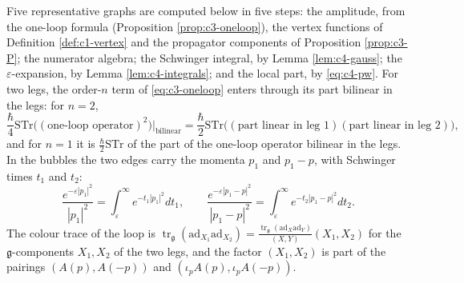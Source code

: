 Five representative graphs are computed below in five steps: the amplitude, from the one-loop formula (Proposition \ref{prop:c3-oneloop}), the vertex functions of Definition \ref{def:c1-vertex} and the propagator components of Proposition \ref{prop:c3-P}; the numerator algebra; the Schwinger integral, by Lemma \ref{lem:c4-gauss}; the $\varepsilon$-expansion, by Lemma \ref{lem:c4-integrals}; and the local part, by \eqref{eq:c4-pw}. For two legs, the order-$n$ term of \eqref{eq:c3-oneloop} enters through its part bilinear in the legs: for $n=2$,
\[
\frac\hbar4\mathrm{STr}\big((\text{one-loop operator})^2\big)\Big|_{\text{bilinear}}=\frac\hbar2\mathrm{STr}\big((\text{part linear in leg }1)(\text{part linear in leg }2)\big),
\]
and for $n=1$ it is $\frac\hbar2\mathrm{STr}$ of the part of the one-loop operator bilinear in the legs. In the bubbles the two edges carry the momenta $p_1$ and $p_1-p$, with Schwinger times $t_1$ and $t_2$:
\[
\frac{e^{-\varepsilon|p_1|^2}}{|p_1|^2}=\int_\varepsilon^\infty e^{-t_1|p_1|^2}dt_1,\qquad \frac{e^{-\varepsilon|p_1-p|^2}}{|p_1-p|^2}=\int_\varepsilon^\infty e^{-t_2|p_1-p|^2}dt_2 .
\]
The colour trace of the loop is $\operatorname{tr}_{\mathfrak g}(\mathrm{ad}_{X_1}\mathrm{ad}_{X_2})=\frac{\operatorname{tr}_{\mathfrak g}(\mathrm{ad}_X\mathrm{ad}_Y)}{(X,Y)}(X_1,X_2)$ for the $\mathfrak g$-components $X_1,X_2$ of the two legs, and the factor $(X_1,X_2)$ is part of the pairings $(A(p),A(-p))$ and $(\iota_pA(p),\iota_pA(-p))$.

